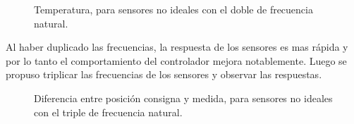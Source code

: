 \documentclass[a4paper, 10pt, onecolumn,journal]{ieeeconf}
\begin{document}
\begin{figure}[H]
	\centering
	\begin{adjustbox}{scale=0.6,max width=\columnwidth}
	\end{adjustbox}
	\caption{Temperatura, para sensores no ideales con el doble de frecuencia natural.}
	\label{Temperatura, para sensores no ideales con el doble de frecuencia natural}
\end{figure}

Al haber duplicado las frecuencias, la respuesta de los sensores es mas rápida y por lo tanto el comportamiento del controlador mejora notablemente. 
Luego se propuso triplicar las frecuencias de los sensores y observar las respuestas.

\begin{figure}[H]
	\centering
	\begin{adjustbox}{scale=0.55,max width=\columnwidth}
	\end{adjustbox}
	\caption{Diferencia entre posición consigna y medida, para sensores no ideales con el triple de frecuencia natural.}
	\label{Diferencia entre posición consignay medida, para sensores no ideales con el triple de frecuencia natural}
\end{figure}
\end{document}
